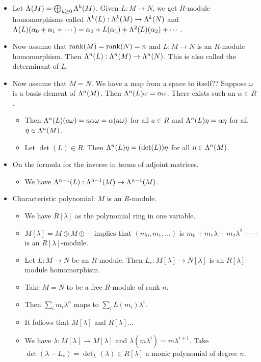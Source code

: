 \documentclass[../notes.tex]{subfiles}
\begin{document}
\begin{itemize}
\begin{itemize}
    \end{itemize}
    \item Let $\lam{M}=\bigoplus_{k\geq 0}\lam[k]{M}$. Given $L:M\to N$, we get $R$-module homomorphisms called $\lam[k]{L}:\lam[k]{M}\to\lam[k]{N}$ and $\lam{L}(\alpha_0+\alpha_1+\cdots)=\alpha_0+L(\alpha_1)+\lam[2]{L}(\alpha_2)+\cdots$.
    \item Now assume that $\rank(M)=\rank(N)=n$ and $L:M\to N$ is an $R$-module homomorphism. Then $\lam[n]{L}:\lam[n]{M}\to\lam[n]{N}$. This is also called the determinant of $L$.
    \item Now assume that $M=N$. We have a map from a space to itself?? Suppose $\omega$ is a basis element of $\lam[n]{M}$. Then $\lam[n]{L}\omega=\alpha\omega$. There exists such an $\alpha\in R$.
    \begin{itemize}
        \item Then $\lam[n]{L}(a\omega)=a\alpha\omega=\alpha(a\omega)$ for all $a\in R$ and $\lam[n]{L}\eta=\alpha\eta$ for all $\eta\in\lam[n]{M}$.
        \item Let $\det(L)\in R$. Then $\lam[n]{L}\eta=(\det(L))\eta$ for all $\eta\in\lam[n]{M}$.
    \end{itemize}
    \item On the formula for the inverse in terms of adjoint matrices.
    \begin{itemize}
        \item We have $\lam[n-1]{L}:\lam[n-1]{M}\to\lam[n-1]{M}$.
    \end{itemize}
    \item Characteristic polynomial: $M$ is an $R$-module.
    \begin{itemize}
        \item We have $R[\lambda]$ as the polynomial ring in one variable.
        \item $M[\lambda]=M\oplus M\oplus\cdots$ implies that $(m_0,m_1,\dots)$ is $m_0+m_1\lambda+m_2\lambda^2+\cdots$ is an $R[\lambda]$-module.
        \item Let $L:M\to N$ be an $R$-module. Then $L_e:M[\lambda]\to N[\lambda]$ is an $R[\lambda]$-module homomorphism.
        \item Take $M=N$ to be a free $R$-module of rank $n$.
        \item Then $\sum_im_i\lambda^n$ maps to $\sum_iL(m_i)\lambda^i$.
        \item It follows that $M[\lambda]$ and $R[\lambda]$...
        \item We have $\lambda:M[\lambda]\to M[\lambda]$ and $\lambda(m\lambda^i)=m\lambda^{i+1}$. Take $\det(\lambda-L_e)=\det_L(\lambda)\in R[\lambda]$ a monic polynomial of degree $n$.

\end{itemize}
\end{itemize}
\end{document}
